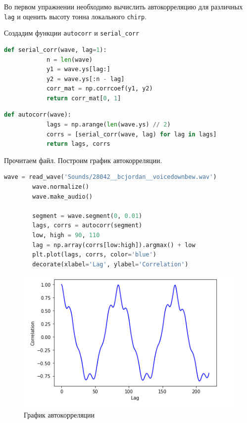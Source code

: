 \documentclass[a4paper, 14pt]{extarticle}
\begin{document}
    Во первом упражнении необходимо вычислить автокорреляцию для различных \texttt{lag} и оценить высоту тонна локального \texttt{chirp}.

    Создадим функции \texttt{autocorr} и \texttt{serial\_corr}

    \begin{lstlisting}[language=Python, caption=Функция serial\_corr, label={lst:serial_corr}]
        def serial_corr(wave, lag=1):
            n = len(wave)
            y1 = wave.ys[lag:]
            y2 = wave.ys[:n - lag]
            corr_mat = np.corrcoef(y1, y2)
            return corr_mat[0, 1]
    \end{lstlisting}

    \begin{lstlisting}[language=Python, caption=Функция autocorr, label={lst:autocorr}]
        def autocorr(wave):
            lags = np.arange(len(wave.ys) // 2)
            corrs = [serial_corr(wave, lag) for lag in lags]
            return lags, corrs
    \end{lstlisting}

    Прочитаем файл.
    Построим график автокорреляции.

    \begin{lstlisting}[language=Python, caption={Чтение файла, построение графика автокорреляции}, label={lst:read_plot_autocorr}]
        wave = read_wave('Sounds/28042__bcjordan__voicedownbew.wav')
        wave.normalize()
        wave.make_audio()

        segment = wave.segment(0, 0.01)
        lags, corrs = autocorr(segment)
        low, high = 90, 110
        lag = np.array(corrs[low:high]).argmax() + low
        plt.plot(lags, corrs, color='blue')
        decorate(xlabel='Lag', ylabel='Correlation')
    \end{lstlisting}

    \begin{figure}[H]
        \centering
        \includegraphics[width=0.8\linewidth]{autocorr_wave}
        \caption{График автокорреляции}
        \label{fig:autocorr_wave}
    \end{figure}
\end{document}
